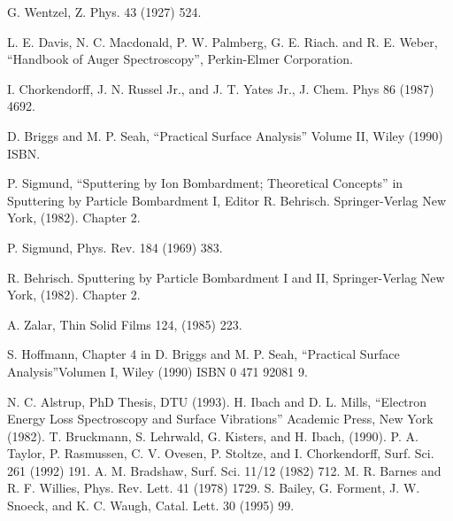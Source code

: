 \documentclass[12pt]{book}
\begin{document}
\begin{thebibliography}{99}
          G. Wentzel, Z. Phys. 43 (1927) 524.

               L.  E.  Davis,   N.   C.   Macdonald,
          P. W. Palmberg, G. E. Riach. and R. E. Weber, ``Handbook  of
          Auger Spectroscopy'', Perkin-Elmer Corporation.

              I.  Chorkendorff,  J.  N.  Russel
          Jr., and J. T. Yates Jr., J. Chem. Phys 86 (1987) 4692.

              D. Briggs and M. P. Seah, ``Practical
          Surface Analysis'' Volume II, Wiley (1990) ISBN.




            P.  Sigmund,   ``Sputtering   by   Ion
          Bombardment;  Theoretical  Concepts''   in   Sputtering   by
          Particle Bombardment I, Editor R. Behrisch.  Springer-Verlag
          New York, (1982). Chapter 2.

           P. Sigmund, Phys. Rev. 184 (1969) 383.

                       R. Behrisch.  Sputtering   by
          Particle Bombardment I and  II,  Springer-Verlag  New  York,
          (1982). Chapter 2.

           A. Zalar, Thin Solid Films 124, (1985) 223.

           S. Hoffmann, Chapter 4 in D. Briggs and M.
          P.  Seah,  ``Practical  Surface  Analysis''Volumen  I,  Wiley
          (1990) ISBN 0 471 92081 9.

           N. C. Alstrup, PhD Thesis, DTU (1993).
  H. Ibach and D. L. Mills, ``Electron Energy Loss Spectroscopy and Surface Vibrations'' Academic Press, New York (1982).
 T. Bruckmann, S. Lehrwald, G. Kisters, and H. Ibach, (1990).
 P. A. Taylor, P. Rasmussen, C. V. Ovesen, P. Stoltze, and I. Chorkendorff, Surf. Sci. 261 (1992) 191.
 A. M. Bradshaw, Surf. Sci. 11/12 (1982) 712.
 M. R. Barnes and R. F. Willies, Phys. Rev. Lett. 41 (1978) 1729.
  S. Bailey, G. Forment, J. W. Snoeck, and K. C. Waugh, Catal. Lett. 30 (1995) 99.




\end{thebibliography}
\end{document}
